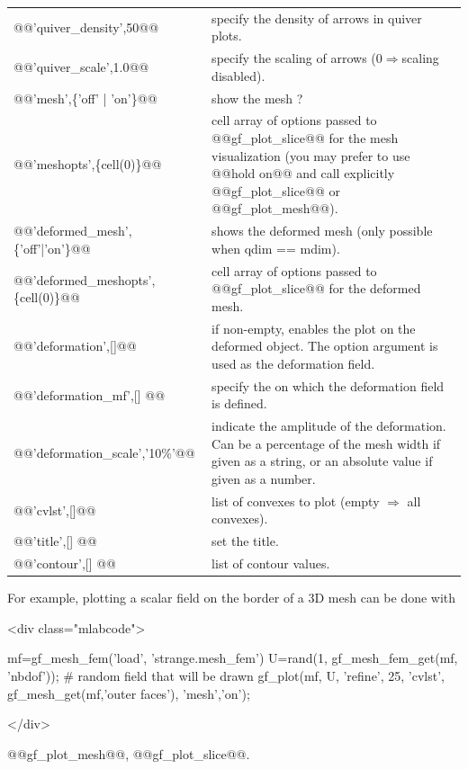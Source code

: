 \documentclass[11pt,a4paper]{article}
\newcommand{\newpage}{}
\newcommand{\vartype}[1]{\xmlattributes*{a}{class="mltype"}{\link{#1}{typelist}}}
\newenvironment{mcode}{\begin{rawxml}<div class="mlabcode">\end{rawxml}\begin{example}}{\end{example}\begin{rawxml}</div>\end{rawxml}}
\newcommand{\vartype}[1]{\texttt{\textit{\hyperlink{typelist}{\textcolor{darkred}{#1}}}}}
\newenvironment{mcode}{\begin{alltt}}{\end{alltt}}
\newcommand{\tmf}{\vartype{mesh\_fem}\xspace}
\begin{document}
\begin{cmddescription}
\begin{center}
\begin{tabular}{|lp{}|}
  @@'quiver_density',50@@   &     specify the density of arrows in quiver plots. \\

  @@'quiver_scale',1.0@@   &        specify the scaling of arrows (0$\Rightarrow$scaling disabled).\\

  @@'mesh',\{'off' | 'on'\}@@ &          show the mesh ?\\

  @@'meshopts',\{cell(0)\}@@ &          cell array of options passed to @@gf_plot_slice@@ for the mesh visualization (you may prefer to use @@hold on@@ and call explicitly @@gf_plot_slice@@ or @@gf_plot_mesh@@).\\

  @@'deformed_mesh', \{'off'|'on'\}@@ &  shows the deformed mesh (only possible when qdim == mdim).\\

  @@'deformed_meshopts', \{cell(0)\}@@ & cell array of options passed to @@gf_plot_slice@@ 
                                  for the deformed mesh.\\

  @@'deformation',[]@@&        if non-empty, enables the plot on the deformed object. The option argument is used as the deformation field.\\

  @@'deformation_mf',[] @@&     specify the \tmf on which the deformation field is defined.\\

  @@'deformation_scale','10\%'@@ &   indicate the amplitude of the deformation. Can be 
                               a percentage of the mesh width if given as a string, 
                               or an absolute value if given as a number.\\

  @@'cvlst',[]@@ &                     list of convexes to plot (empty $\Rightarrow$ all convexes).\\

  @@'title',[]  @@ &                set the title.\\

  @@'contour',[]   @@ &             list of contour values.\\
\hline
\end{tabular}
\end{center}


  For example, plotting a scalar field on the border of a 3D mesh can be done with
  \begin{mcode}
mf=gf_mesh_fem('load', 'strange.mesh_fem') 
U=rand(1, gf_mesh_fem_get(mf, 'nbdof')); # random field that will be drawn
gf_plot(mf, U, 'refine', 25, 'cvlst', gf_mesh_get(mf,'outer faces'), 'mesh','on');
  \end{mcode}

\end{cmddescription}
\begin{gfseealso}
  @@gf\_plot\_mesh@@, @@gf_plot_slice@@.
\end{gfseealso}
\newpage
\end{document}

